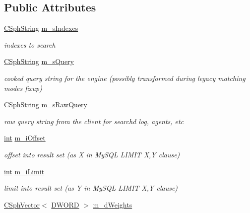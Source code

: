 \subsection*{Public Attributes}
\begin{DoxyCompactItemize}
\item 
\hyperlink{structCSphString}{C\-Sph\-String} \hyperlink{classCSphQuery_a45a23107b5561879993db1c25161b7ac}{m\-\_\-s\-Indexes}
\begin{DoxyCompactList}\small\item\em indexes to search \end{DoxyCompactList}\item 
\hyperlink{structCSphString}{C\-Sph\-String} \hyperlink{classCSphQuery_a532a2ff6c5f30e1d8d7ae2261763d460}{m\-\_\-s\-Query}
\begin{DoxyCompactList}\small\item\em cooked query string for the engine (possibly transformed during legacy matching modes fixup) \end{DoxyCompactList}\item 
\hyperlink{structCSphString}{C\-Sph\-String} \hyperlink{classCSphQuery_a2d086a1ba48cad3f3ca95f34d86a24e3}{m\-\_\-s\-Raw\-Query}
\begin{DoxyCompactList}\small\item\em raw query string from the client for searchd log, agents, etc \end{DoxyCompactList}\item 
\hyperlink{sphinxexpr_8cpp_a4a26e8f9cb8b736e0c4cbf4d16de985e}{int} \hyperlink{classCSphQuery_a6db8997e8178e6a3e6e8f07dcb326d00}{m\-\_\-i\-Offset}
\begin{DoxyCompactList}\small\item\em offset into result set (as X in My\-S\-Q\-L L\-I\-M\-I\-T X,Y clause) \end{DoxyCompactList}\item 
\hyperlink{sphinxexpr_8cpp_a4a26e8f9cb8b736e0c4cbf4d16de985e}{int} \hyperlink{classCSphQuery_a298bca477453ebef5bd1eaef40271b59}{m\-\_\-i\-Limit}
\begin{DoxyCompactList}\small\item\em limit into result set (as Y in My\-S\-Q\-L L\-I\-M\-I\-T X,Y clause) \end{DoxyCompactList}\item 
\hyperlink{classCSphVector}{C\-Sph\-Vector}$<$ \hyperlink{sphinxstd_8h_a798af1e30bc65f319c1a246cecf59e39}{D\-W\-O\-R\-D} $>$ \hyperlink{classCSphQuery_a691bd7f7c26b1ba472448961724306d0}{m\-\_\-d\-Weights}

\end{DoxyCompactItemize}
